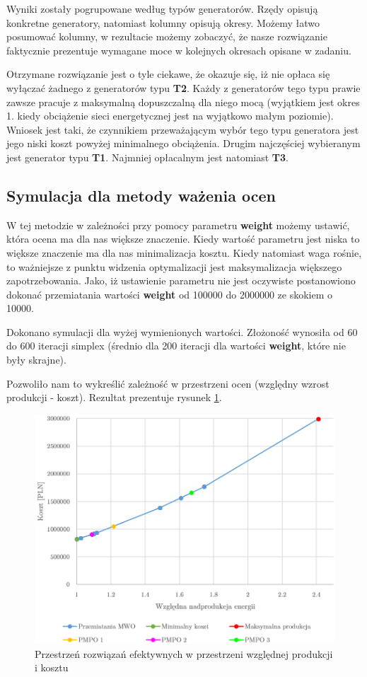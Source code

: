 \documentclass[12pt, twoside, hidelinks, a4paper]{article}
\begin{document}
Wyniki zostały pogrupowane według typów generatorów. Rzędy opisują konkretne generatory, natomiast kolumny opisują okresy. Możemy łatwo posumować kolumny, w rezultacie możemy zobaczyć, że nasze rozwiązanie faktycznie prezentuje wymagane moce w kolejnych okresach opisane w zadaniu.

Otrzymane rozwiązanie jest o tyle ciekawe, że okazuje się, iż nie opłaca się wyłączać żadnego z generatorów typu \textbf{T2}. Każdy z generatorów tego typu prawie zawsze pracuje z maksymalną dopuszczalną dla niego mocą (wyjątkiem jest okres 1. kiedy obciążenie sieci energetycznej jest na wyjątkowo małym poziomie). Wniosek jest taki, że czynnikiem przeważającym wybór tego typu generatora jest jego niski koszt powyżej minimalnego obciążenia. Drugim najczęściej wybieranym jest generator typu \textbf{T1}. Najmniej opłacalnym jest natomiast \textbf{T3}.

\subsection{Symulacja dla metody ważenia ocen} \label{sec:weight}
W tej metodzie w zależności przy pomocy parametru \textbf{weight} możemy ustawić, która ocena ma dla nas większe znaczenie. Kiedy wartość parametru jest niska to większe znaczenie ma dla nas minimalizacja kosztu. Kiedy natomiast waga rośnie, to ważniejsze z punktu widzenia optymalizacji jest maksymalizacja większego zapotrzebowania. Jako, iż ustawienie parametru nie jest oczywiste postanowiono dokonać przemiatania wartości \textbf{weight} od 100000 do 2000000 ze skokiem o 10000.

Dokonano symulacji dla wyżej wymienionych wartości. Złożoność wynosiła od 60 do 600 iteracji simplex (średnio dla 200 iteracji dla wartości \textbf{weight}, które nie były skrajne).

Pozwoliło nam to wykreślić zależność w przestrzeni ocen (względny wzrost produkcji - koszt). Rezultat prezentuje rysunek \ref{fig:plot}.

\begin{figure}[H]
\centering
\includegraphics[scale=0.4]{plot_new.png}
\caption{Przestrzeń rozwiązań efektywnych w przestrzeni względnej produkcji i kosztu}
\label{fig:plot}
\end{figure}
\end{document}
